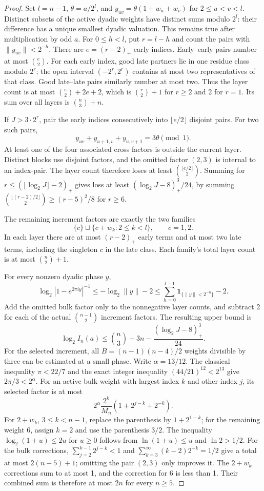\begin{proof}
Set $l=n-1$, $\theta=a/2^l$, and
$y_{uv}=\theta(1+w_u+w_v)$ for $2\le u<v<l$.
Distinct subsets of the active dyadic weights have distinct sums
modulo $2^l$: their difference has a unique smallest dyadic
valuation.  This remains true after multiplication by odd $a$.
For $0\le h<l$, put $r=l-h$ and count the pairs with
$\|y_{uv}\|<2^{-h}$.  There are $e=(r-2)_+$ early indices.
Early--early pairs number at most $\binom e2$.  For each early
index, good late partners lie in one residue class modulo $2^r$;
the open interval $(-2^r,2^r)$ contains at most two representatives
of that class.  Good late--late pairs similarly number at most
two.  Thus the layer count is at most
$\binom e2+2e+2$, which is $\binom r2+1$ for $r\ge2$ and 2
for $r=1$.  Its sum over all layers is $\binom n3+n$.

If $J>3\cdot2^r$, pair the early indices consecutively into
$\lfloor e/2\rfloor$ disjoint pairs.  For two such pairs,
\[
 y_{uv}+y_{u+1,v}+y_{u,v+1}=3\theta\pmod1.
\]
At least one of the four associated cross factors is outside the
current layer.  Distinct blocks use disjoint factors, and the
omitted factor $(2,3)$ is internal to an index-pair.  The layer
count therefore loses at least $\binom{\lfloor e/2\rfloor}{2}$.
Summing for $r\le(\lfloor\log_2J\rfloor-2)_+$ gives loss at
least $(\log_2J-8)_+^3/24$, by summing
$\binom{\lfloor(r-2)/2\rfloor}{2}\ge(r-5)^2/8$ for $r\ge6$.

The remaining increment factors are exactly the two families
\[
       \{c\}\sqcup\{c+w_k:2\le k<l\},\qquad c=1,2.
\]
In each layer there are at most $(r-2)_+$ early terms and at
most two late terms, including the singleton $c$ in the late
class.  Each family's total layer count is at most
$\binom n2+1$.

For every nonzero dyadic phase $y$,
\[
 \log_2|1-e^{2\pi iy}|^{-1}
   \le -\log_2\|y\|-2
   \le \sum_{h=0}^{l-1}\mathbf1_{\{\|y\|<2^{-h}\}}-2.
\]
Add the omitted bulk factor only to the nonnegative layer counts,
and subtract 2 for each of the actual $\binom{n-1}{2}$ increment
factors.  The resulting upper bound is
\[
 \log_2 I_n(a)\le\binom n3+3n
                    -\frac{(\log_2J-8)_+^3}{24}.
\]
For the selected increment, all $B=(n-1)(n-4)/2$ weights
divisible by three can be estimated at a small phase.  Write
$\alpha=13/12$.  The classical inequality $\pi<22/7$ and
the exact integer inequality $(44/21)^{12}<2^{13}$ give
$2\pi/3<2^\alpha$.  For an active bulk weight with largest
index $k$ and other index $j$, its selected factor is at most
\[
  2^\alpha\frac{2^k}{M_n}
                       (1+2^{j-k}+2^{-k}).
\]
For $2+w_k$, $3\le k<n-1$, replace the parenthesis by
$1+2^{1-k}$; for the remaining weight 6, assign $k=2$ and
use the parenthesis $3/2$.  The inequality
$\log_2(1+u)\le2u$ for $u\ge0$ follows from
$\ln(1+u)\le u$ and $\ln2>1/2$.
For the bulk corrections,
$\sum_{j=2}^{k-1}2^{j-k}<1$ and
$\sum_{k=3}^\infty(k-2)2^{-k}=1/2$ give a total at most
$2(n-5)+1$; omitting the pair $(2,3)$ only improves it.
The $2+w_k$ corrections sum to at most 1, and the correction
for 6 is less than 1.  Their combined sum is therefore at
most $2n$ for every $n\ge5$.


\end{proof}
